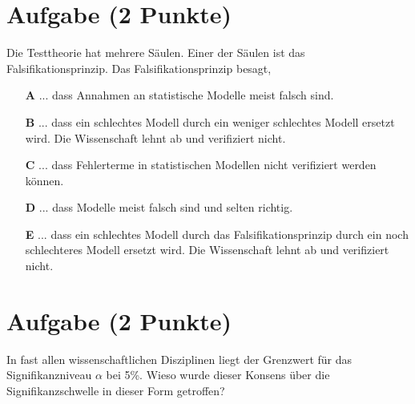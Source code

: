 \documentclass[a4paper, 9pt]{scrartcl}\usepackage[]{graphicx}\usepackage[]{xcolor}
\begin{document}
\section{Aufgabe \hfill (2 Punkte)}



Die Testtheorie hat mehrere Säulen. Einer der Säulen ist das Falsifikationsprinzip. Das Falsifikationsprinzip besagt,



\begin{enumerate}
\item [\textbf{A} \msquare] ... dass Annahmen an statistische Modelle meist falsch sind.
\item [\textbf{B} \msquare] ... dass ein schlechtes Modell durch ein weniger schlechtes Modell ersetzt wird. Die Wissenschaft lehnt ab und verifiziert nicht.
\item [\textbf{C} \msquare] ... dass Fehlerterme in statistischen Modellen nicht verifiziert werden können.
\item [\textbf{D} \msquare] ... dass Modelle meist falsch sind und selten richtig.
\item [\textbf{E} \msquare] ... dass ein schlechtes Modell durch das Falsifikationsprinzip durch ein noch schlechteres Modell ersetzt wird. Die Wissenschaft lehnt ab und verifiziert nicht.
\end{enumerate}

\section{Aufgabe \hfill (2 Punkte)}



In fast allen wissenschaftlichen Disziplinen liegt der Grenzwert für das Signifikanzniveau $\alpha$ bei 5\%. Wieso wurde dieser Konsens über die Signifikanzschwelle in dieser Form getroffen?
\end{document}

